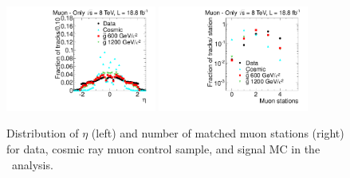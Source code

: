 \begin{figure}
\centering
  \includegraphics[clip=true, trim=0.0cm 0cm 2.8cm 0cm, width=0.44\textwidth]{figures/muonly/Selection_Comp_8TeV_Cosmic_Eta_BS}
  \includegraphics[clip=true, trim=0.0cm 0cm 2.8cm 0cm, width=0.44\textwidth]{figures/muonly/Selection_Comp_8TeV_Cosmic_MatchedStations_BS} \\
\caption[Distribution of $\eta$ and number of matched muon stations for data, cosmic ray muon control sample, and signal MC in the \muononly\ analysis.]
{Distribution of $\eta$ (left) and number of matched muon stations (right) for data, cosmic ray muon control sample, and signal MC in the \muononly\ analysis.}
    \label{fig:MuOnlyPreselA}
\end{figure}

